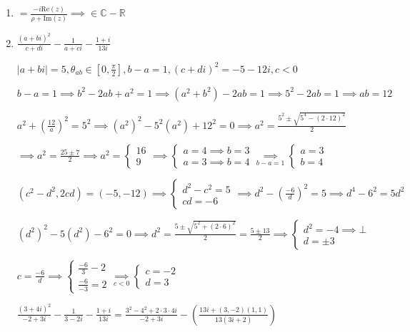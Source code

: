 \documentclass[12pt, openright, a4paper, twoside, english, brazil]{article}
\newenvironment{qitem}{
  \color{black}
\item}{\vspace{10pt}}
\begin{document}
\begin{enumerate}[\bfseries 1.]
\begin{qitem}
    $\displaystyle=\frac{-i\text{Re}(z)}{\rho+\text{Im}(z)}\implies
    \in\mathbb C-\mathbb R$
  \end{qitem}

  \begin{qitem} %
    $\displaystyle \frac{(a+bi)^2}{c+di}-\frac{1}{a+ci}-\frac{1+i}{13i}$

    $\displaystyle |a+bi|=5, \theta_{ab}\in[0,\frac{\pi}{2}], b-a=1,
    (c+di)^2=-5-12i, c<0$

    \color{red}
    $b-a=1\implies b^2-2ab+a^2=1\implies (a^2+b^2)-2ab=1\implies
    5^2-2ab=1\implies ab=12$

    $\displaystyle a^2+\left(\frac{12}{a}\right)^2=5^2\implies
    (a^2)^2-5^2(a^2)+12^2=0\implies
    a^2=\frac{5^2\pm\sqrt{5^4-(2\cdot12)^2}}{2}$

    $\displaystyle\implies a^2=\frac{25\pm7}{2}\implies a^2=
    \begin{cases}16\\9
    \end{cases}\implies
    \begin{cases}a=4\implies b=3\\a=3\implies b=4
    \end{cases} \underset{b-a=1}{\implies}
    \begin{cases}a=3\\b=4
    \end{cases}$

    $(c^2-d^2,2cd)=(-5,-12)\implies
    \begin{cases}d^2-c^2=5\\cd=-6
    \end{cases}\implies d^2-(\frac{-6}{d})^2=5\implies d^4-6^2=5d^2$

    $\displaystyle(d^2)^2-5(d^2)-6^2=0\implies
    d^2=\frac{5\pm\sqrt{5^2+(2\cdot 6)^2}}{2}=\frac{5\pm13}{2}\implies
    \begin{cases}d^2=-4\implies\bot\\
      d=\pm3
    \end{cases}$

    $\displaystyle c=\frac{-6}{d}\implies
    \begin{cases}\frac{-6}{3}-2\\\frac{-6}{-3}=2
    \end{cases}\underset{c<0}{\implies}
    \begin{cases}c=-2\\d=3
    \end{cases}$

    $\displaystyle
    \frac{(3+4i)^2}{-2+3i}-\frac{1}{3-2i}-\frac{1+i}{13i}=\frac{3^2-4^2+2\cdot3\cdot
    4i}{-2+3i}-\left(\frac{13i+(3,-2)(1,1)}{13(3i+2)}\right)$


\end{qitem}
\end{enumerate}
\end{document}
